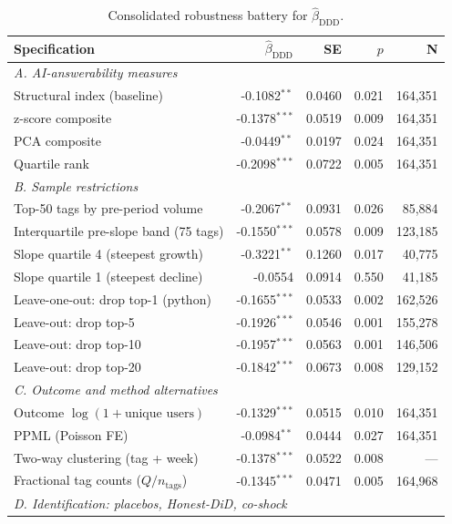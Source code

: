 \begin{table}[!htbp]
\centering
\footnotesize
\caption{Consolidated robustness battery for $\hat\beta_{\text{DDD}}$.}
\label{tab:rp_robustness}
\begin{tabular}{lrrrr}
\toprule
Specification & $\hat\beta_{\text{DDD}}$ & SE & $p$ & N \\
\midrule
\multicolumn{5}{l}{\textit{A. AI-answerability measures}} \\
  Structural index (baseline) & -0.1082$^{**}$ & 0.0460 & 0.021 & 164,351 \\
  z-score composite & -0.1378$^{***}$ & 0.0519 & 0.009 & 164,351 \\
  PCA composite & -0.0449$^{**}$ & 0.0197 & 0.024 & 164,351 \\
  Quartile rank & -0.2098$^{***}$ & 0.0722 & 0.005 & 164,351 \\
\midrule
\multicolumn{5}{l}{\textit{B. Sample restrictions}} \\
  Top-50 tags by pre-period volume & -0.2067$^{**}$ & 0.0931 & 0.026 & 85,884 \\
  Interquartile pre-slope band (75 tags) & -0.1550$^{***}$ & 0.0578 & 0.009 & 123,185 \\
  Slope quartile 4 (steepest growth) & -0.3221$^{**}$ & 0.1260 & 0.017 & 40,775 \\
  Slope quartile 1 (steepest decline) & -0.0554 & 0.0914 & 0.550 & 41,185 \\
  Leave-one-out: drop top-1 (python) & -0.1655$^{***}$ & 0.0533 & 0.002 & 162,526 \\
  Leave-out: drop top-5 & -0.1926$^{***}$ & 0.0546 & 0.001 & 155,278 \\
  Leave-out: drop top-10 & -0.1957$^{***}$ & 0.0563 & 0.001 & 146,506 \\
  Leave-out: drop top-20 & -0.1842$^{***}$ & 0.0673 & 0.008 & 129,152 \\
\midrule
\multicolumn{5}{l}{\textit{C. Outcome and method alternatives}} \\
  Outcome $\log(1+\text{unique users})$ & -0.1329$^{***}$ & 0.0515 & 0.010 & 164,351 \\
  PPML (Poisson FE) & -0.0984$^{**}$ & 0.0444 & 0.027 & 164,351 \\
  Two-way clustering (tag + week) & -0.1378$^{***}$ & 0.0522 & 0.008 & --- \\
  Fractional tag counts ($Q/n_{\text{tags}}$) & -0.1345$^{***}$ & 0.0471 & 0.005 & 164,968 \\
\midrule
\multicolumn{5}{l}{\textit{D. Identification: placebos, Honest-DiD, co-shock}} \\

\end{tabular}
\end{table}
